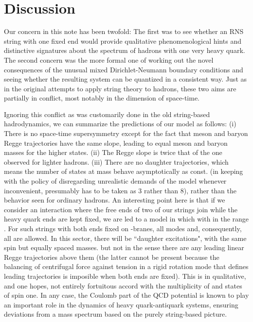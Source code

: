 \documentclass[a4paper,a4paper]{article}
\begin{document}
\section{Discussion}

Our concern in this note has been twofold: The first was to see whether an
RNS string with one fixed end would provide qualitative
phenomenological hints and distinctive signatures about the spectrum of
hadrons with one very heavy quark.  The second concern was the more formal
one of working out the novel consequences of the unusual mixed
Dirichlet-Neumann boundary conditions and seeing  whether the
resulting system can be quantized in a consistent way. Just as in the
original attempts to apply string theory to hadrons, these two aims are
partially in conflict, most notably in the dimension of space-time.

Ignoring this conflict as was customarily done in the old string-based
hadrodynamics, we can summarize the predictions of our model as follows:
(i) There is no
space-time supersymmetry except for the fact that meson and baryon Regge
trajectories have the same slope, leading to equal meson and baryon masses
for the higher states. (ii)  The Regge slope is twice that of the one
observed for lighter hadrons. (iii) There are no daughter trajectories,
which means the number of states at mass \coordHE{} behave asymptotically
as const. \coordHE{} (in keeping with the policy of disregarding
unrealistic demands of the model whenever inconvenient, \coordHE{} presumably
has to be taken as 3 rather than 8), rather than the \coordHE{}
behavior seen for ordinary hadrons.  An interesting point here is that if
we consider an interaction where the free
ends of two of our strings  join  while the heavy quark ends are kept
fixed, we are led to a model in which \coordHE{} with \myHighlight{$\sigma$}\coordHE{} in the range
\myHighlight{$[0,\pi]$}\coordHE{}.  For such strings with both ends fixed on \coordHE{}-branes, all
\coordHE{} modes and, consequently, all \coordHE{} are allowed.  In this
sector, there will be ``daughter excitations", with the same spin but
equally spaced masses. but not in the sense there
are any leading linear Regge trajectories above them (the latter cannot be
present  because the
balancing of centrifugal force against tension in a rigid rotation
mode that defines leading trajectories is imposible when both
ends are fixed). This is in qualitative, and one hopes, not entirely
fortuitous  accord with the multiplicity of
\coordHE{} and \coordHE{} states of spin one. In any case,
the Coulomb part of the QCD potential is known to play an
important role in the dynamics of heavy quark-antiquark systems, ensuring
deviations from a mass spectrum based on the purely string-based picture.
\end{document}
